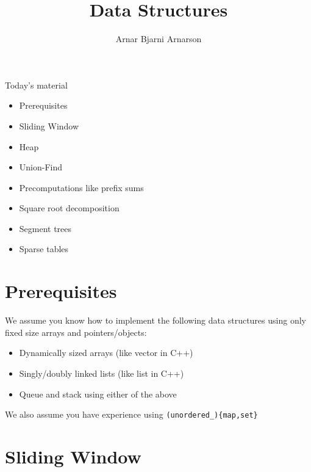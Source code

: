 \documentclass{beamer}
\title{Data Structures}
\author{Arnar Bjarni Arnarson}
\institute{\href{http://ru.is/td}{School of Computer Science} \\[2pt] \href{http://ru.is}{Reykjavík University}}
\begin{document}
\maketitle

\begin{frame}[plain]{Today's material}
    \begin{itemize}
        \item Prerequisites
        \item Sliding Window
        \item Heap
        \item Union-Find
        \item Precomputations like prefix sums
        \item Square root decomposition
        \item Segment trees
        \item Sparse tables
    \end{itemize}
\end{frame}

\section*{Prerequisites}

\begin{frame}[plain]
    We assume you know how to implement the following data structures using only fixed size arrays and pointers/objects:
    \begin{itemize}
        \item Dynamically sized arrays (like vector in C++)
        \item Singly/doubly linked lists (like list in C++)
        \item Queue and stack using either of the above
    \end{itemize}
    We also assume you have experience using \texttt{(unordered\_)\{map,set\}}
\end{frame}

\section*{Sliding Window}
\end{document}
